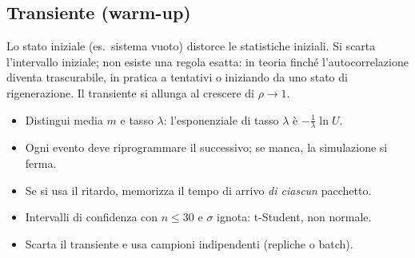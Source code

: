 \subsection{Transiente (warm-up)}
Lo stato iniziale (es.\ sistema vuoto) distorce le statistiche iniziali. Si scarta l'intervallo iniziale; non esiste una regola esatta: in teoria finché l'autocorrelazione diventa trascurabile, in pratica a tentativi o iniziando da uno stato di rigenerazione. Il transiente si allunga al crescere di $\rho\to1$.

\begin{attenzione}
\begin{itemize}[nosep]
\item Distingui media $m$ e tasso $\lambda$: l'esponenziale di tasso $\lambda$ è $-\tfrac1\lambda\ln U$.
\item Ogni evento deve riprogrammare il successivo; se manca, la simulazione si ferma.
\item Se si usa il ritardo, memorizza il tempo di arrivo \emph{di ciascun} pacchetto.
\item Intervalli di confidenza con $n\le30$ e $\sigma$ ignota: t-Student, non normale.
\item Scarta il transiente e usa campioni indipendenti (repliche o batch).
\end{itemize}
\end{attenzione}
